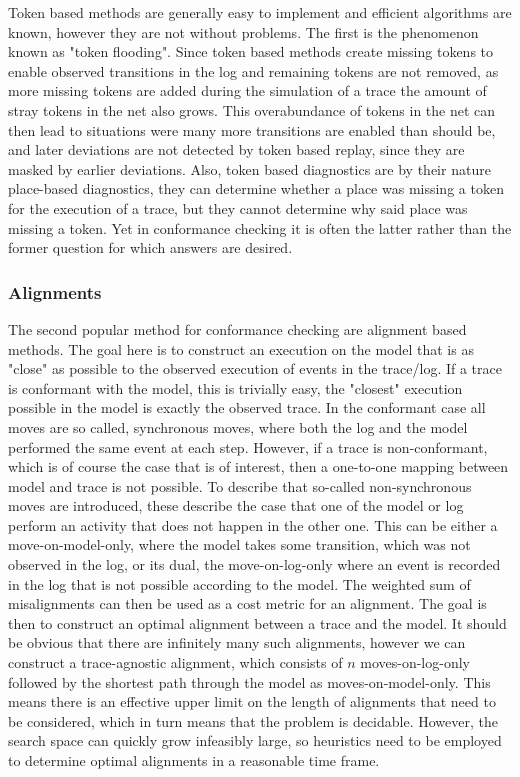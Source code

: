 \documentclass[runningheads]{template/llncs}
\begin{document}
Token based methods are generally easy to implement and efficient algorithms are known, however they are not without problems.
The first is the phenomenon known as "token flooding". Since token based methods create missing tokens to enable observed transitions in the log and remaining tokens are not removed, as more missing tokens are added during the simulation of a trace the  amount of stray tokens in the net also grows.
This overabundance of tokens in the net can then lead to situations were many more transitions are enabled than should be, and later deviations are not detected by token based replay, since they are masked by earlier deviations.
Also, token based diagnostics are  by their nature place-based diagnostics, they can determine whether a place was missing a token for the execution of a trace, but they cannot determine why said place was missing a token. 
Yet in conformance checking it is often the latter rather than the former question for which answers are desired. 

\subsubsection{Alignments}

The second popular method for conformance checking are alignment based methods.
The goal here is to construct an execution on the model that is as "close" as possible to the observed execution of events in the trace/log.
If a trace is conformant with the model, this is trivially easy, the "closest" execution possible in the model is exactly the observed trace.
In the conformant case all moves are so called, synchronous moves, where both the log and the model performed the same event at each step.
However, if a trace is non-conformant, which is of course the case that is of interest, then a one-to-one mapping between model and trace is not possible.
To describe that so-called non-synchronous moves are introduced, these describe the case that one of  the model or log perform an activity that does not happen in the other one.
This can be either a move-on-model-only, where the model takes some transition, which was not observed in the log, or its dual, the move-on-log-only where an event is recorded in the log that is not possible according to the model.
The weighted sum of misalignments can then be used as a cost metric for an alignment. 
The goal is then to construct an optimal alignment between a trace and the model.
It should be obvious that there are infinitely many such alignments, however we can construct a trace-agnostic alignment, which consists of $n$ moves-on-log-only followed by the shortest path through the model as moves-on-model-only.
This means there is an effective upper limit on the length of alignments that need to be considered, which in turn means that the problem is decidable. 
However, the search space can quickly grow infeasibly large, so heuristics need to be employed to determine optimal alignments in a reasonable time frame.
\end{document}
